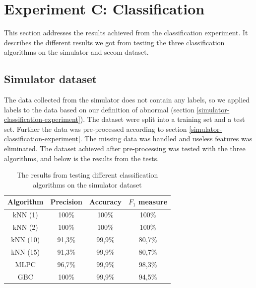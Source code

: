 \documentclass[english, a4paper]{report}
\begin{document}
{    \section{Experiment C: Classification}\label{ClassificationResult}
    {
        This section addresses the results achieved from the classification experiment. It describes the different results we got from testing the three classification algorithms on the simulator and \gls{secom} dataset.
        \par 
        
        \subsection{Simulator dataset}
        {
            The data collected from the simulator does not contain any labels, so we applied labels to the data based on our definition of abnormal (section \ref{simulator-classification-experiment}). The dataset were split into a training set and a test set. Further the data was pre-processed according to section \ref{simulator-classification-experiment}. The missing data was handled and useless features was eliminated. The dataset achieved after pre-processing was tested with the three algorithms, and below is the results from the tests.
            
            \begin{table}[H]
                \centering
                \begin{tabular}{|c|c|c|c|}
                    \hline
                    \textbf{   Algorithm   } & \textbf{   Precision   } & \textbf{   Accuracy   } & \textbf{   $F_1$ measure   } \\ \hline
                     kNN (1) & 100\% & 100\% & 100\% \\ \hline
                     kNN (2) & 100\% & 100\% & 100\% \\ \hline
                     kNN (10) & 91,3\% & 99,9\% & 80,7\% \\ \hline
                     kNN (15) & 91,3\% & 99,9\% & 80,7\% \\ \hline
                     MLPC & 96,7\% & 99,9\% & 98,3\% \\ \hline
                     GBC & 100\% & 99,9\% & 94,5\% \\ \hline
                \end{tabular}
                \caption{The results from testing different classification algorithms on the simulator dataset}
                \label{tab:sim-results}
            \end{table}
        
}}}
\end{document}

